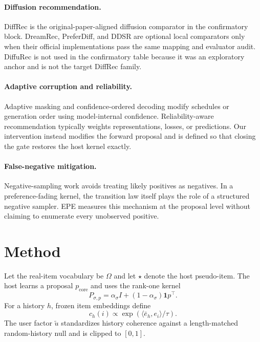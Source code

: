 \documentclass[letterpaper]{article}
\newcommand{\pcore}{p_{\mathrm{core}}}
\newcommand{\ch}{c_h}
\newcommand{\ut}{\widetilde u}
\begin{document}
\paragraph{Diffusion recommendation.}
DiffRec is the original-paper-aligned diffusion comparator in the confirmatory block. DreamRec, PreferDiff, and DDSR are optional local comparators only when their official implementations pass the same mapping and evaluator audit. DiffuRec is not used in the confirmatory table because it was an exploratory anchor and is not the target DiffRec family.

\paragraph{Adaptive corruption and reliability.}
Adaptive masking and confidence-ordered decoding modify schedules or generation order using model-internal confidence. Reliability-aware recommendation typically weights representations, losses, or predictions. Our intervention instead modifies the forward proposal and is defined so that closing the gate restores the host kernel exactly.

\paragraph{False-negative mitigation.}
Negative-sampling work avoids treating likely positives as negatives. In a preference-fading kernel, the transition law itself plays the role of a structured negative sampler. EPE measures this mechanism at the proposal level without claiming to enumerate every unobserved positive.

\section{Method}
Let the real-item vocabulary be $\Omega$ and let $\star$ denote the host pseudo-item. The host learns a proposal $\pcore$ and uses the rank-one kernel
\begin{equation}
P_{\sigma,p}=\alpha_\sigma I+(1-\alpha_\sigma)\mathbf{1}p^\top.
\end{equation}
For a history $h$, frozen item embeddings define
\begin{equation}
\ch(i)\propto\exp(\langle \bar e_h,e_i\rangle/\tau).
\end{equation}
The user factor $\ut$ standardizes history coherence against a length-matched random-history null and is clipped to $[0,1]$.
\end{document}
